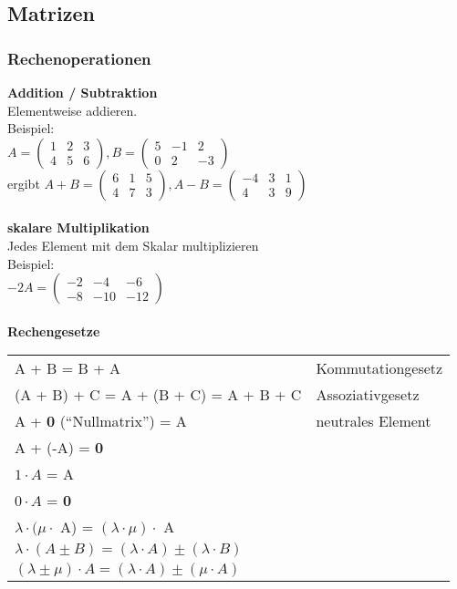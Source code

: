 \documentclass[6pt,a4paper]{scrartcl}
\begin{document}
\begin{multicols*}{3}
\subsection{Matrizen}
\subsubsection{Rechenoperationen}
\textbf{Addition / Subtraktion} \\
Elementweise addieren.\\
Beispiel:\\
$A=\begin{pmatrix}1&2&3\\4&5&6\end{pmatrix}, B=\begin{pmatrix}5&-1&2\\0&2&-3\end{pmatrix}$ \\
ergibt $A+B=\begin{pmatrix}6&1&5\\4&7&3\end{pmatrix},	A-B=\begin{pmatrix}-4&3&1\\4&3&9\end{pmatrix}$ \\
\\
\textbf{skalare Multiplikation} \\
Jedes Element mit dem Skalar multiplizieren \\
Beispiel: \\
$-2A = \begin{pmatrix}-2&-4&-6\\-8&-10&-12\end{pmatrix}$ \\
\\
\textbf{Rechengesetze}
\begin{tabular}{l|l}
A + B = B + A & Kommutationgesetz \\
(A + B) + C = A + (B + C) = A + B + C & Assoziativgesetz \\
A + \textbf{0} (``Nullmatrix'') = A & neutrales Element \\
A + (-A) = \textbf{0} & \\
$1 \cdot A$ = A & \\
$0 \cdot A$ = \textbf{0} & \\
$\lambda \cdot (\mu \cdot$  A) = $(\lambda \cdot \mu) \cdot $ A & \\
$\lambda\cdot(A\pm B) = (\lambda\cdot A) \pm (\lambda\cdot B)$  &  \\
$(\lambda\pm \mu)\cdot A = (\lambda\cdot A) \pm (\mu\cdot A)$  & \\
\end{tabular} \\
\\

\end{multicols*}
\end{document}
